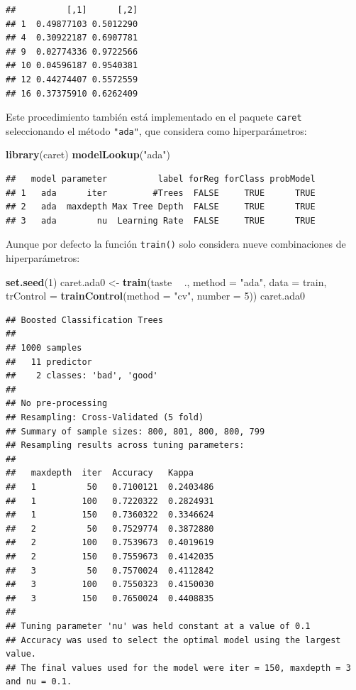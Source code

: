 \documentclass[
  spanish,
]{book}
\newenvironment{Shaded}{\begin{snugshade}}{\end{snugshade}}
\newcommand{\DataTypeTok}[1]{\textcolor[rgb]{0.13,0.29,0.53}{#1}}
\newcommand{\DecValTok}[1]{\textcolor[rgb]{0.00,0.00,0.81}{#1}}
\newcommand{\KeywordTok}[1]{\textcolor[rgb]{0.13,0.29,0.53}{\textbf{#1}}}
\newcommand{\NormalTok}[1]{#1}
\newcommand{\OperatorTok}[1]{\textcolor[rgb]{0.81,0.36,0.00}{\textbf{#1}}}
\newcommand{\StringTok}[1]{\textcolor[rgb]{0.31,0.60,0.02}{#1}}
\theoremstyle{break}
\theoremstyle{definition}
\theoremstyle{definition}
\theoremstyle{definition}
\theoremstyle{remark}
\begin{document}
\begin{verbatim}
##          [,1]      [,2]
## 1  0.49877103 0.5012290
## 4  0.30922187 0.6907781
## 9  0.02774336 0.9722566
## 10 0.04596187 0.9540381
## 12 0.44274407 0.5572559
## 16 0.37375910 0.6262409
\end{verbatim}

Este procedimiento también está implementado en el paquete \texttt{caret} seleccionando el método \texttt{"ada"}, que considera como hiperparámetros:

\begin{Shaded}
\begin{Highlighting}[]
\KeywordTok{library}\NormalTok{(caret)}
\KeywordTok{modelLookup}\NormalTok{(}\StringTok{"ada"}\NormalTok{)}
\end{Highlighting}
\end{Shaded}

\begin{verbatim}
##   model parameter          label forReg forClass probModel
## 1   ada      iter         #Trees  FALSE     TRUE      TRUE
## 2   ada  maxdepth Max Tree Depth  FALSE     TRUE      TRUE
## 3   ada        nu  Learning Rate  FALSE     TRUE      TRUE
\end{verbatim}

Aunque por defecto la función \texttt{train()} solo considera nueve combinaciones de hiperparámetros:

\begin{Shaded}
\begin{Highlighting}[]
\KeywordTok{set.seed}\NormalTok{(}\DecValTok{1}\NormalTok{)}
\NormalTok{caret.ada0 <-}\StringTok{ }\KeywordTok{train}\NormalTok{(taste }\OperatorTok{~}\StringTok{ }\NormalTok{., }\DataTypeTok{method =} \StringTok{"ada"}\NormalTok{, }\DataTypeTok{data =}\NormalTok{ train,}
                   \DataTypeTok{trControl =} \KeywordTok{trainControl}\NormalTok{(}\DataTypeTok{method =} \StringTok{"cv"}\NormalTok{, }\DataTypeTok{number =} \DecValTok{5}\NormalTok{))}
\NormalTok{caret.ada0}
\end{Highlighting}
\end{Shaded}

\begin{verbatim}
## Boosted Classification Trees 
## 
## 1000 samples
##   11 predictor
##    2 classes: 'bad', 'good' 
## 
## No pre-processing
## Resampling: Cross-Validated (5 fold) 
## Summary of sample sizes: 800, 801, 800, 800, 799 
## Resampling results across tuning parameters:
## 
##   maxdepth  iter  Accuracy   Kappa    
##   1          50   0.7100121  0.2403486
##   1         100   0.7220322  0.2824931
##   1         150   0.7360322  0.3346624
##   2          50   0.7529774  0.3872880
##   2         100   0.7539673  0.4019619
##   2         150   0.7559673  0.4142035
##   3          50   0.7570024  0.4112842
##   3         100   0.7550323  0.4150030
##   3         150   0.7650024  0.4408835
## 
## Tuning parameter 'nu' was held constant at a value of 0.1
## Accuracy was used to select the optimal model using the largest value.
## The final values used for the model were iter = 150, maxdepth = 3 and nu = 0.1.
\end{verbatim}
\end{document}
